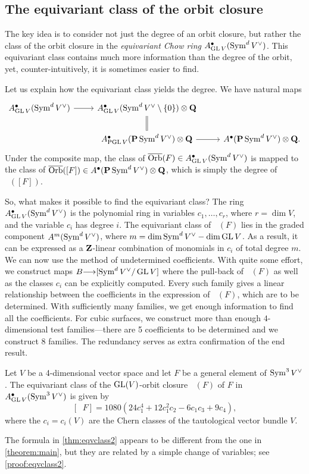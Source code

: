 \documentclass[12pt,reqno]{amsart}
\DeclareMathOperator{\Orb}{\overline{Orb}}
\renewcommand{\to}{{\longrightarrow}}
\numberwithin{equation}{section}
\begin{document}
\subsection{The equivariant class of the orbit closure}
The key idea is to consider not just the degree of an orbit closure,
but rather the class of the orbit closure in the {\sl equivariant Chow
  ring} $A^\bullet_{\operatorname{GL} V}(\operatorname{Sym}^dV^\vee)$.  This equivariant class
contains much more information than the degree of the orbit, yet,
counter-intuitively, it is sometimes easier to find.

Let us explain how the equivariant class yields the degree.
We have natural maps
\[
\begin{tikzcd}
  A^\bullet_{\GL V}(\Sym^dV^\vee) \ar{r}& A^\bullet_{\GL V}(\Sym^d V^\vee \setminus
  \{0\}) \otimes \Q \ar[equal]{d}\\
  &A^\bullet_{\PGL V}(\P \Sym^dV^\vee) \otimes \Q \ar{r}&
  A^\bullet(\P \Sym^dV^\vee) \otimes \Q.
\end{tikzcd}
\]
Under the composite map, the class of
$\Orb(F) \in A^\bullet_{\GL V}(\Sym^dV^\vee)$ is mapped to the class
of $\Orb([F]) \in A^\bullet(\P \Sym^dV^\vee) \otimes \Q$, which is
simply the degree of $\Orb([F])$.

So, what makes it possible to find the equivariant class?  The ring
$A^\bullet_{\operatorname{GL} V}(\operatorname{Sym}^dV^\vee)$ is the polynomial ring in variables
$c_1, \dots, c_r$, where $r = \dim V$, and the variable $c_i$ has
degree $i$.  The equivariant class of $\Orb(F)$ lies in the graded
component $A^m(\operatorname{Sym}^dV^\vee)$, where
$m = \dim \operatorname{Sym}^d V^\vee - \dim \operatorname{GL} V$.  As a result, it can be
expressed as a ${\bf Z}$-linear combination of monomials in $c_i$ of total
degree $m$. We can now use the method of undetermined coefficients.
With quite some effort, we construct maps $B \to [\Sym^dV^\vee/\GL V]$
where the pull-back of $\Orb(F)$ as well as the classes $c_i$ can be
explicitly computed. Every such family gives a linear relationship
between the coefficients in the expression of $\Orb(F)$, which are to
be determined.  With sufficiently many families, we get enough
information to find all the coefficients.  For cubic surfaces, we
construct more than enough $4$-dimensional test families---there are 5
coefficients to be determined and we construct 8 families. The
redundancy serves as extra confirmation of the end result.
\begin{theorem}\label{thm:eqvclass2}
  Let $V$ be a 4-dimensional vector space and let $F$ be a general
  element of $\operatorname{Sym}^3 V^\vee$.
  The equivariant class of the $\operatorname{GL}(V)$-orbit closure $\Orb(F)$ of $F$
  in $A^\bullet_{\operatorname{GL} V}(\operatorname{Sym}^3 V^\vee)$ is given by
  \[
    [\Orb F] = 1080 (24c_1^4 + 12c_1^2c_2 - 6c_1c_3 + 9c_4),
  \]
  where the \(c_i = c_i(V)\) are the Chern classes of the tautological vector
  bundle $V$.
\end{theorem}
The formula in \autoref{thm:eqvclass2} appears to be different from
the one in \autoref{theorem:main}, but they are related by a simple
change of variables; see \autoref{proof:eqvclass2}.
\end{document}
